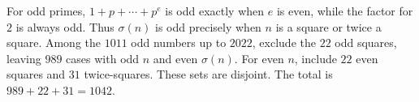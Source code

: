 For odd primes, $1+p+\cdots+p^e$ is odd exactly when $e$ is even, while the factor for $2$ is always odd. Thus $\sigma(n)$ is odd precisely when $n$ is a square or twice a square. Among the $1011$ odd numbers up to $2022$, exclude the $22$ odd squares, leaving $989$ cases with odd $n$ and even $\sigma(n)$. For even $n$, include $22$ even squares and $31$ twice-squares. These sets are disjoint. The total is $989+22+31=\boxed{1042}$.
